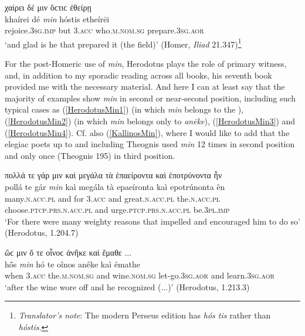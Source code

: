 \begin{exe}
\ex χαίρει δέ μιν ὅϲτιϲ ἐθείρῃ\\
\gll khaírei dé \emph{min} hóstis etheírēi\\
rejoice.\textsc{3sg.imp} but \textsc{3.acc} who.\textsc{m.nom.sg} prepare.\textsc{3sg.aor}\\
\trans `and glad is he that prepared it (the field)' (Homer, \emph{Iliad} 21.347)\footnote{\emph{Translator's note}: The modern Perseus edition has \textit{hós tis} rather than \textit{hóstis}.}
\label{phi347}
\end{exe}

For the post-Homeric use of \emph{min}, Herodotus plays the role of primary witness, and, in addition to my sporadic reading across all books, his seventh book provided me with the necessary material. And here I can at least say that the majority of examples show \emph{min} in second or near-second position, including such typical cases as (\ref{HerodotusMin1}) (in which \emph{min} belongs to the ), (\ref{HerodotusMin2}) (in which \emph{min} belongs only to \emph{anēke}), (\ref{HerodotusMin3}) and (\ref{HerodotusMin4}). Cf. also (\ref{KallinosMin}), where I would like to add that the elegiac poets up to and including Theognis used \emph{min} 12 times in second position and only once (Theognis 195) in third position.

\begin{exe}
\ex πολλά τε γάρ {μιν} καὶ μεγάλα τὰ ἐπαείροντα καὶ ἐποτρύνοντα ἦν\\
\gll pollá te gár \emph{min} kaì megála tà epaeíronta kaì epotrúnonta ên\\
many.\textsc{n.acc.pl} and for \textsc{3.acc} and great.\textsc{n.acc.pl} the.\textsc{n.acc.pl} choose.\textsc{ptcp.prs.n.acc.pl} and urge.\textsc{ptcp.prs.n.acc.pl} be.\textsc{3pl.imp}\\
\trans `For there were many weighty reasons that impelled and encouraged him to do so' (Herodotus, 1.204.7)
\label{HerodotusMin1}
\end{exe}

\begin{exe}
\ex ὥϲ {μιν} ὅ τε οἶνοϲ ἀνῆκε καὶ ἔμαθε ...\\
\gll hṓs \emph{min} hó te oînos anêke kaì émathe\\
when \textsc{3.acc} the.\textsc{m.nom.sg} and wine.\textsc{nom.sg} let-go.\textsc{3sg.aor} and learn.\textsc{3sg.aor}\\
\trans `after the wine wore off and he recognized (...)' (Herodotus, 1.213.3)
\label{HerodotusMin2}
\end{exe}

